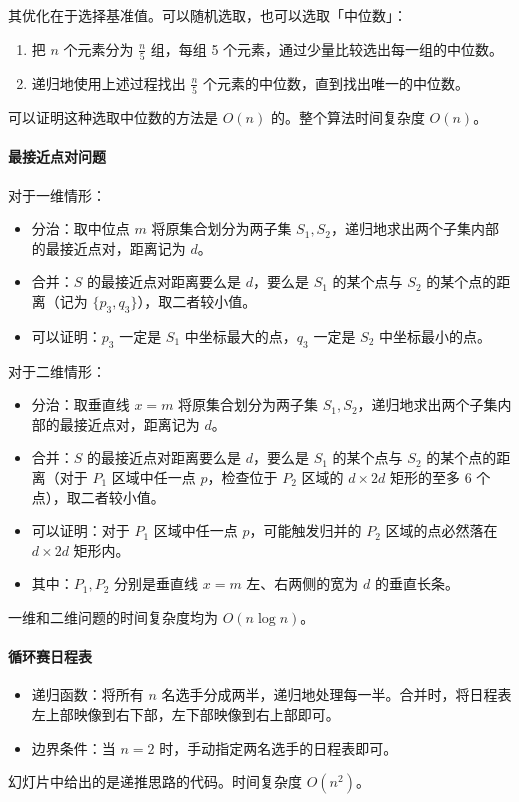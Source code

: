 \documentclass[UTF8]{ctexart}
\newcommand\Emph[1]{\textcolor{cyan!80!black}{#1}}
\begin{document}
其优化在于选择基准值。可以随机选取，也可以选取「中位数」：
\begin{enumerate}[itemsep=0pt,parsep=0pt]
  \item 把 $n$ 个元素分为 $\frac n5$ 组，每组 5 个元素，通过少量比较选出每一组的中位数。
  \item 递归地使用上述过程找出 $\frac n5$ 个元素的中位数，直到找出唯一的中位数。
\end{enumerate}
可以证明这种选取中位数的方法是 $O(n)$ 的。整个算法\Emph{时间复杂度 $O(n)$。}

\paragraph{最接近点对问题} 对于一维情形：
\begin{itemize}
  \item 分治：取中位点 $m$ 将原集合划分为两子集 $S_1,S_2$，递归地求出两个子集内部的最接近点对，距离记为 $d$。
  \item 合并：$S$ 的最接近点对距离要么是 $d$，要么是 $S_1$ 的某个点与 $S_2$ 的某个点的距离（记为 $\{p_3,q_3\}$），取二者较小值。
  \item 可以证明：$p_3$ 一定是 $S_1$ 中坐标最大的点，$q_3$ 一定是 $S_2$ 中坐标最小的点。
\end{itemize}

{\noindent 对于二维情形：}
\begin{itemize}
  \item 分治：取垂直线 $x=m$ 将原集合划分为两子集 $S_1,S_2$，递归地求出两个子集内部的最接近点对，距离记为 $d$。
  \item 合并：$S$ 的最接近点对距离要么是 $d$，要么是 $S_1$ 的某个点与 $S_2$ 的某个点的距离（对于 $P_1$ 区域中任一点 $p$，检查位于 $P_2$ 区域的 $d\times 2d$ 矩形的至多 6 个点），取二者较小值。
  \item 可以证明：对于 $P_1$ 区域中任一点 $p$，可能触发归并的 $P_2$ 区域的点必然落在 $d\times 2d$ 矩形内。
  \item 其中：$P_1,P_2$ 分别是垂直线 $x=m$ 左、右两侧的宽为 $d$ 的垂直长条。
\end{itemize}

一维和二维问题的\Emph{时间复杂度均为 $O(n\log n)$。}

\paragraph{循环赛日程表} 
\begin{itemize}
  \item 递归函数：将所有 $n$ 名选手分成两半，递归地处理每一半。合并时，将日程表左上部映像到右下部，左下部映像到右上部即可。
  \item 边界条件：当 $n=2$ 时，手动指定两名选手的日程表即可。
\end{itemize}
幻灯片中给出的是递推思路的代码。\Emph{时间复杂度 $O(n^2)$。}
\end{document}
